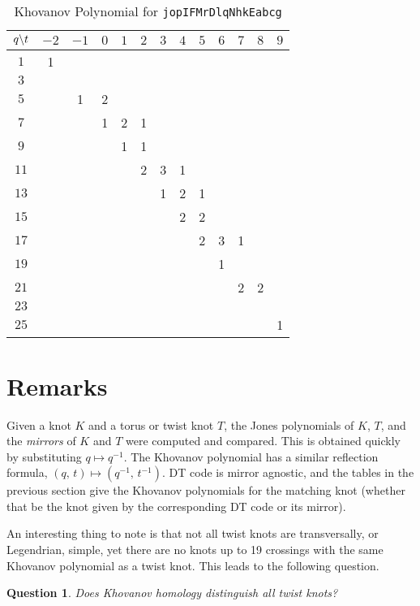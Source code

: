 \documentclass{article}
\theoremstyle{plain}
\newtheorem{question}{Question}
\begin{document}
        \begin{table}[H]
            \centering
            \begin{tabular}{| c | c | c | c | c | c | c | c | c | c | c | c | c |}
                \hline
                $q\symbol{92}t$&$-2$&$-1$&$0$&$1$&$2$&$3$&$4$&$5$&$6$&$7$&$8$&$9$\\
                \hline
                $1$&1&&&&&&&&&&&\\
                \hline
                $3$&&&&&&&&&&&&\\
                \hline
                $5$&&1&2&&&&&&&&&\\
                \hline
                $7$&&&1&2&1&&&&&&&\\
                \hline
                $9$&&&&1&1&&&&&&&\\
                \hline
                $11$&&&&&2&3&1&&&&&\\
                \hline
                $13$&&&&&&1&2&1&&&&\\
                \hline
                $15$&&&&&&&2&2&&&&\\
                \hline
                $17$&&&&&&&&2&3&1&&\\
                \hline
                $19$&&&&&&&&&1&&&\\
                \hline
                $21$&&&&&&&&&&2&2&\\
                \hline
                $23$&&&&&&&&&&&&\\
                \hline
                $25$&&&&&&&&&&&&1\\
                \hline
            \end{tabular}
            \caption{Khovanov Polynomial for \texttt{jopIFMrDlqNhkEabcg}}
            \label{table:jopIFMrDlqNhkEabcg_kho}
        \end{table}
    \section{Remarks}
        Given a knot $K$ and a torus or twist knot $T$, the Jones polynomials
        of $K$, $T$, and the \textit{mirrors} of $K$ and $T$ were computed and
        compared. This is obtained quickly by
        substituting $q\mapsto{q}^{-1}$. The Khovanov polynomial has a similar
        reflection formula, $(q,\,t)\mapsto(q^{-1},\,t^{-1})$. DT code is
        mirror agnostic, and the tables in the previous section give the
        Khovanov polynomials for the matching knot (whether that be the knot
        given by the corresponding DT code or its mirror).
        \par\hfill\par
        An interesting thing to note is that not all twist knots are
        transversally, or Legendrian, simple, yet there are no knots up to
        19 crossings with the same Khovanov polynomial as a twist knot. This
        leads to the following question.
        \begin{question}
            Does Khovanov homology distinguish all twist knots?
        \end{question}
\end{document}
